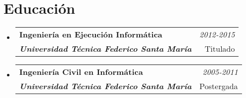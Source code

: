 \documentclass[a4paper,11pt]{article}
\makeatletter
\newcommand{\resumeSubheading}[4]{
\vspace{0.5mm}\item
    \begin{tabular*}{0.98\textwidth}[t]{l@{\extracolsep{\fill}}r}
        \textbf{#1} & \textit{\footnotesize{#4}} \\
        \textit{\textbf {\footnotesize{#3}}} &  \footnotesize{#2}\\
    \end{tabular*}
    \vspace{-2.4mm}
}
\newcommand{\resumeProject}[4]{
\vspace{0.5mm}\item
    \begin{tabular*}{0.98\textwidth}[t]{l@{\extracolsep{\fill}}r}
        \textbf{#1} & \textit{\footnotesize{#3}} \\
        \footnotesize{\textit{#2}} & \footnotesize{#4}
    \end{tabular*}
    \vspace{-2.4mm}
}
\newcommand{\resumeSubHeadingListStart}{\begin{itemize}[leftmargin=*,labelsep=0mm]}
\newcommand{\resumeItemListStart}{\begin{justify}\begin{itemize}[leftmargin=3ex, rightmargin=2ex, noitemsep,labelsep=1.2mm,itemsep=0mm]\small}
\newcommand{\resumeSubHeadingListEnd}{\end{itemize}\vspace{2mm}}
\newcommand{\resumeItemListEnd}{\end{itemize}\end{justify}\vspace{-2mm}}
\makeatother
\begin{document}
\section{\textbf{Educación}}
  \resumeSubHeadingListStart
    \resumeSubheading
      {Ingeniería en Ejecución Informática}{Titulado}
      {Universidad Técnica Federico Santa María}{2012-2015}
    \resumeSubheading
      {Ingeniería Civil en Informática}{Postergada}
      {Universidad Técnica Federico Santa María}{2005-2011}
  \resumeSubHeadingListEnd
\vspace{-5.5mm}
%
\begin{comment}
\section{\textbf{Proyectos Personales}}
\resumeSubHeadingListStart
    \resumeProject
      {Web Based Facial Authentication(Liveness Detection)} %
      {A website based facial authentication system, implemented using a Chrome Extension.} %
      {} %

      \resumeItemListStart
        \item {Facilitating users' logins to websites without having to remember their credentials}
        \item {Used Live detection techniques to create high order security.}
        \item {Technology Used: Python, Reactjs, Bootstrap.}
    \resumeItemListEnd
    \vspace{-2mm}
    
    \resumeProject
      {Realtime Chat App} %
      {A react based web application which allow users to chat in real time. } %
      {} %

      \resumeItemListStart
        \item {Used Firebase Authentication(SDK) to facilitate authentication \& Cloud Firestore to store data.}
        \item {Technology Used: Reactjs, Firebase, Bootstrap, HTML.}
    \resumeItemListEnd
    \vspace{-2mm}

    \resumeProject
      {Covid-19 Tracker} %
      {Daily and weekly updated statistics tracking the number of COVID-19 cases, recovered, and deaths.} %
      {} %

      \resumeItemListStart
        \item {Tracking world-wide cases using google maps and live API stats and datasets.}
        \item {Technology Used : JavaScript , CSS, HTML, API.
}
    \resumeItemListEnd
      
  \resumeSubHeadingListEnd
\vspace{-8.5mm}
\end{comment}
\end{document}
